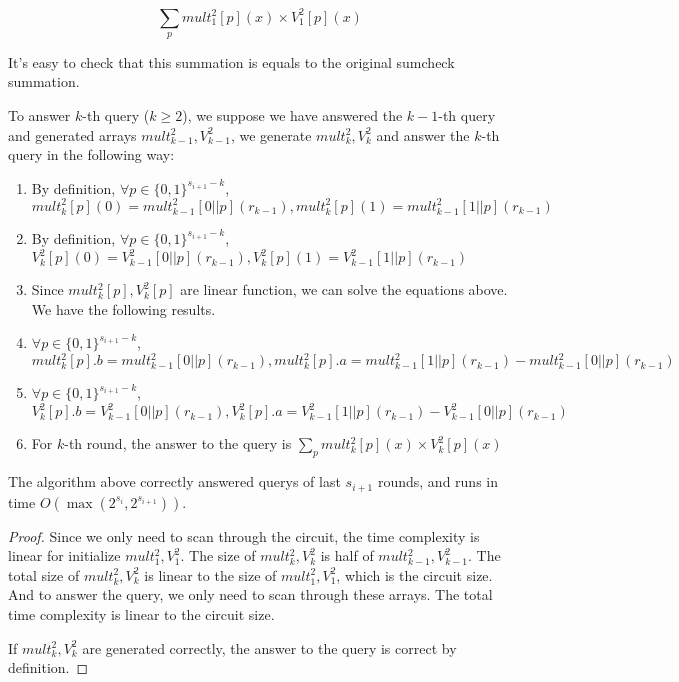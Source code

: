 {$$\sum_{p}mult_{1}^2[p](x)\times V_1^2[p](x)$$

It's easy to check that this summation is equals to the original sumcheck summation.

To answer $k$-th query ($k\ge 2$), we suppose we have answered the $k-1$-th query and generated arrays $mult_{k-1}^2, V_{k-1}^2$, we generate $mult_{k}^2, V_{k}^2$ and answer the $k$-th query in the following way:

\begin{enumerate}
	\item By definition, $\forall p \in {\{0, 1\}^{s_{i+1}-k}}$, $mult_{k}^2[p](0)=mult_{k-1}^2[0||p](r_{k-1}), mult_{k}^2[p](1)=mult_{k-1}^2[1||p](r_{k-1})$
	\item By definition, $\forall p \in {\{0, 1\}^{s_{i+1}-k}}$, $V_{k}^2[p](0)=V_{k-1}^2[0||p](r_{k-1}), V_{k}^2[p](1)=V_{k-1}^2[1||p](r_{k-1})$
	\item Since $mult_{k}^2[p], V_{k}^2[p]$ are linear function, we can solve the equations above. We have the following results.
	\item $\forall p \in {\{0, 1\}^{s_{i+1}-k}}$, $mult_{k}^2[p].b = mult_{k-1}^2[0||p](r_{k-1}), mult_{k}^2[p].a = mult_{k-1}^2[1||p](r_{k-1})-mult_{k-1}^2[0||p](r_{k-1})$
	\item $\forall p \in {\{0, 1\}^{s_{i+1}-k}}$, $V_{k}^2[p].b = V_{k-1}^2[0||p](r_{k-1}), V_{k}^2[p].a = V_{k-1}^2[1||p](r_{k-1})-V_{k-1}^2[0||p](r_{k-1})$
	\item For $k$-th round, the answer to the query is $\sum_{p} mult_{k}^2[p](x)\times V_{k}^2[p](x)$
\end{enumerate}

\begin{theorem} The algorithm above correctly answered querys of last $s_{i+1}$ rounds, and runs in time $O(\max(2^{s_{i}}, 2^{s_{i+1}}))$.
\end{theorem}

\begin{proof}
Since we only need to scan through the circuit, the time complexity is linear for initialize $mult_{1}^2, V_1^2$. The size of $mult_{k}^2, V_k^2$ is half of $mult_{k-1}^2, V_{k-1}^2$. The total size of $mult_{k}^2, V_k^2$ is linear to the size of $mult_1^2, V_1^2$, which is the circuit size. And to answer the query, we only need to scan through these arrays. The total time complexity is linear to the circuit size.

If $mult_k^2, V_k^2$ are generated correctly, the answer to the query is correct by definition.


\end{proof}}
